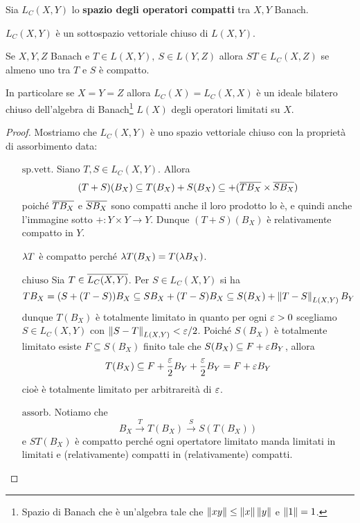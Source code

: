 \begin{definition}[]
Sia $L_C(X,Y)$ lo \textbf{spazio degli operatori compatti} tra $X,Y$ Banach.
\end{definition}
\begin{remark}
$L_C(X,Y)$ \`e un sottospazio vettoriale chiuso di $L(X,Y)$.
\end{remark}
\begin{proposition}
Se $X,Y,Z$ Banach e $T\in L(X,Y),\ S\in L(Y,Z)$ allora $ST\in L_C(X,Z)$ se almeno uno tra $T$ e $S$ \`e compatto.

In particolare se $X=Y=Z$ allora $L_C(X)=L_C(X,X)$ \`e un ideale bilatero chiuso dell'algebra di Banach\footnote{Spazio di Banach che \`e un'algebra tale che $\left\Vert{xy}\right\Vert\leq\left\Vert{x}\right\Vert\left\Vert{y}\right\Vert$ e $\left\Vert{1}\right\Vert=1$.} $L(X)$ degli operatori limitati su $X$.
\end{proposition}
\begin{proof}
Mostriamo che $L_C(X,Y)$ \`e uno spazio vettoriale chiuso con la propriet\`a di assorbimento data:
\setlength{\leftmargini}{0cm}
\begin{itemize}
\item[$\boxed{\text{sp.vett.}}$] Siano $T,S\in L_C(X,Y)$. Allora 
\[(T+S)(B_X)\subseteq T(B_X)+S(B_X)\subseteq +(\overline{T B_X}\times\overline{S B_X})\]
poich\'e $\overline{T B_X}$ e $\overline{S B_X}$ sono compatti anche il loro prodotto lo \`e, e quindi anche l'immagine sotto $+:Y\times Y\to Y$. Dunque $(T+S)(B_X)$ \`e relativamente compatto in $Y$.

$\lambda T$ \`e compatto perch\'e $\lambda T(B_X)=T(\lambda B_X)$.
\item[$\boxed{\text{chiuso}}$] Sia $T\in \overline{L_C(X,Y)}$. Per $S\in L_C(X,Y)$ si ha
\[T B_X=(S+(T-S))B_X\subseteq S B_X+(T-S)B_X\subseteq S(B_X)+\left\Vert{T-S}\right\Vert_{L(X,Y)} B_Y\]
dunque $T(B_X)$ \`e totalmente limitato in quanto per ogni $\varepsilon>0$ scegliamo $S\in L_C(X,Y)$ con $\left\Vert{S-T}\right\Vert_{L(X,Y)}<\varepsilon/2$. Poich\'e $S(B_X)$ \`e totalmente limitato esiste $F\subseteq S(B_X)$ finito tale che $S(B_X)\subseteq F+\varepsilon B_Y$, allora
\[T(B_X)\subseteq F+\frac{\varepsilon}2 B_Y+\frac{\varepsilon}2 B_Y=F+\varepsilon B_Y\]
cio\`e \`e totalmente limitato per arbitrareit\`a di $\varepsilon$.
\item[$\boxed{\text{assorb.}}$] Notiamo che
\[B_X\xrightarrow{T}T(B_X)\xrightarrow{S}S(T(B_X))\]
e $ST(B_X)$ \`e compatto perch\'e ogni opertatore limitato manda limitati in limitati e (relativamente) compatti in (relativamente) compatti.
\end{itemize}
\setlength{\leftmargini}{0.5cm}

\end{proof}


